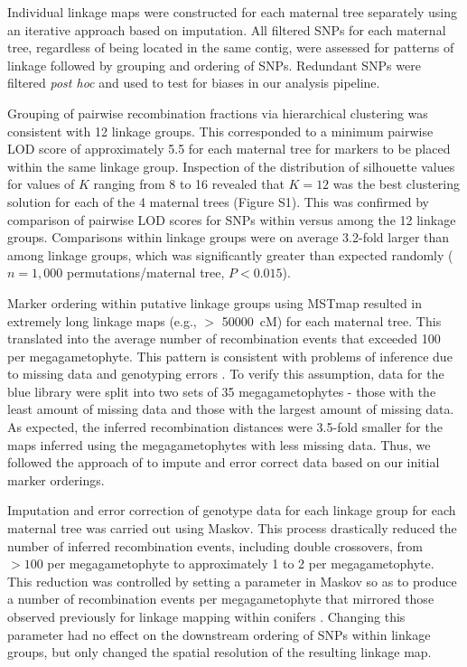 \documentclass[smallextended]{svjour3}
\begin{document}
Individual linkage maps were constructed for each maternal tree separately using an iterative approach
based on imputation. All filtered SNPs for each maternal tree, regardless of being located in the same contig,
were assessed for patterns of linkage followed by grouping and ordering of SNPs. Redundant SNPs were filtered
\textit{post hoc} and used to test for biases in our analysis pipeline.

Grouping of pairwise recombination fractions via hierarchical clustering was consistent with \num{12} linkage groups. 
This corresponded to a minimum pairwise LOD score of approximately 5.5 for each maternal tree for markers to be placed within the same linkage group.
Inspection of the distribution of silhouette values for values of $K$ ranging from \num{8} to \num{16} revealed that $K = 12$ was the best 
clustering solution for each of the \num{4} maternal trees (Figure S1). This was confirmed by comparison of pairwise LOD scores 
for SNPs within versus among the \num{12} linkage groups. Comparisons within linkage groups were on average 3.2-fold larger
than among linkage groups, which was significantly greater than expected randomly ($n = 1,000$
permutations/maternal tree, $P < 0.015$). 

Marker ordering within putative linkage groups using MSTmap resulted in extremely long linkage maps (e.g., $>$ \SI{50000} {cM}) for each maternal tree. 
This translated into the average number of recombination events that exceeded \num{100} per megagametophyte. This pattern
is consistent with problems of inference due to missing data and genotyping errors \citep{Ward:2013}. To verify this assumption, data for the
blue library were split into two sets of \num{35} megagametophytes - those with the least amount of missing data and those with the 
largest amount of missing data. As expected, the inferred recombination distances were 3.5-fold smaller for the maps inferred
using the megagametophytes with less missing data. Thus, we followed the approach of \citet{Ward:2013} to impute and error correct
data based on our initial marker orderings.

Imputation and error correction of genotype data for each linkage group for each maternal tree was carried out using Maskov. This
process drastically reduced the number of inferred recombination events, including double crossovers, from $>100$ per 
megagametophyte to approximately \num{1} to \num{2} per megagametophyte. This reduction was controlled by setting a parameter
in Maskov so as to produce a number of recombination events per megagametophyte that mirrored those observed previously for
linkage mapping within conifers \citep{Eckert:2009, Martinez-Garcia:2013}. Changing this parameter had no effect on the downstream
ordering of SNPs within linkage groups, but only changed the spatial resolution of the resulting linkage map.
\end{document}
